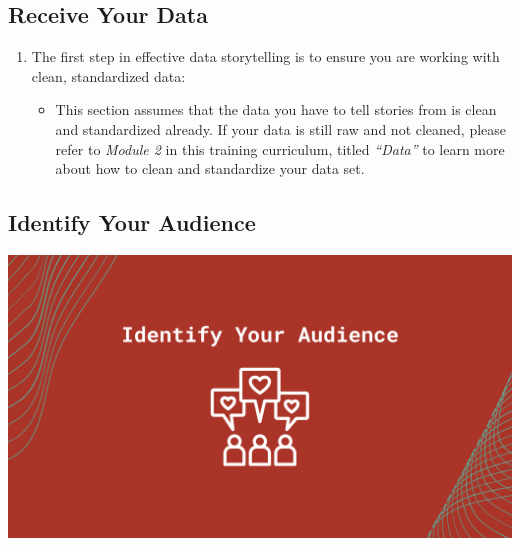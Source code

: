 \documentclass[
]{book}
\providecommand{\tightlist}{%
  \setlength{\itemsep}{0pt}\setlength{\parskip}{0pt}}
\begin{document}
\hypertarget{receive-your-data}{%
\subsection{Receive Your Data}\label{receive-your-data}}

\begin{enumerate}
\def\labelenumi{\arabic{enumi}.}
\tightlist
\item
  The first step in effective data storytelling is to ensure you are working with clean, standardized data:

  \begin{itemize}
  \tightlist
  \item
    This section assumes that the data you have to tell stories from is clean and standardized already. If your data is still raw and not cleaned, please refer to \emph{Module 2} in this training curriculum, titled \emph{``Data''} to learn more about how to clean and standardize your data set.
  \end{itemize}
\end{enumerate}

\hypertarget{identify-your-audience}{%
\subsection{Identify Your Audience}\label{identify-your-audience}}

\includegraphics{images/Data-Storytelling-2.png}
\end{document}
